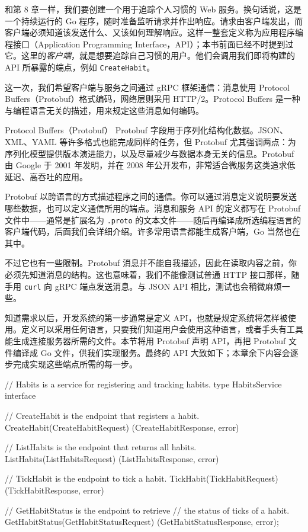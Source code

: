 和第 8 章一样，我们要创建一个用于追踪个人习惯的 Web 服务。换句话说，这是一个持续运行的 Go 程序，随时准备监听请求并作出响应。请求由客户端发出，而客户端必须知道该发送什么、又该如何理解响应。这样一整套定义称为应用程序编程接口（Application Programming Interface，API）；本书前面已经不时提到过它。这里的\emph{客户端}，就是想要追踪自己习惯的用户。他们会调用我们即将构建的 API 所暴露的端点，例如 \texttt{CreateHabit}。

这一次，我们希望客户端与服务之间通过 gRPC 框架通信：消息使用 Protocol Buffers（Protobuf）格式编码，网络层则采用 HTTP/2。Protocol Buffers 是一种与编程语言无关的描述，用来规定这些消息如何编码。

\begin{infobox}{Protocol Buffers（Protobuf）}
Protobuf 字段用于序列化结构化数据。JSON、XML、YAML 等许多格式也能完成同样的任务，但 Protobuf 尤其强调两点：为序列化模型提供版本演进能力，以及尽量减少与数据本身无关的信息。Protobuf 由 Google 于 2001 年发明，并在 2008 年公开发布，非常适合微服务这类追求低延迟、高吞吐的应用。

Protobuf 以跨语言的方式描述程序之间的通信。你可以通过消息定义说明要发送哪些数据，也可以定义通信所用的端点。消息和服务 API 的定义都写在 Protobuf 文件中——通常是扩展名为 \texttt{.proto} 的文本文件——随后再编译成所选编程语言的客户端代码，后面我们会详细介绍。许多常用语言都能生成客户端，Go 当然也在其中。

不过它也有一些限制。Protobuf 消息并不能自我描述，因此在读取内容之前，你必须先知道消息的结构。这也意味着，我们不能像测试普通 HTTP 接口那样，随手用 \texttt{curl} 向 gRPC 端点发送消息。与 JSON API 相比，测试也会稍微麻烦一些。
\end{infobox}

知道需求以后，开发系统的第一步通常是定义 API，也就是规定系统将怎样被使用。定义可以采用任何语言，只要我们知道用户会使用这种语言，或者手头有工具能生成连接服务器所需的文件。本节将用 Protobuf 声明 API，再把 Protobuf 文件编译成 Go 文件，供我们实现服务。最终的 API 大致如下；本章余下内容会逐步完成实现这些端点所需的每一步。

\begin{gocode}[title={代码清单 10.1 习惯服务的 API}]
// Habits is a service for registering and tracking habits.
type HabitsService interface {
    // CreateHabit is the endpoint that registers a habit.
    CreateHabit(CreateHabitRequest) (CreateHabitResponse, error)

    // ListHabits is the endpoint that returns all habits.
    ListHabits(ListHabitsRequest) (ListHabitsResponse, error)

    // TickHabit is the endpoint to tick a habit.
    TickHabit(TickHabitRequest) (TickHabitResponse, error)

    // GetHabitStatus is the endpoint to retrieve
    // the status of ticks of a habit.
    GetHabitStatus(GetHabitStatusRequest) (GetHabitStatusResponse, error);
}
\end{gocode}

